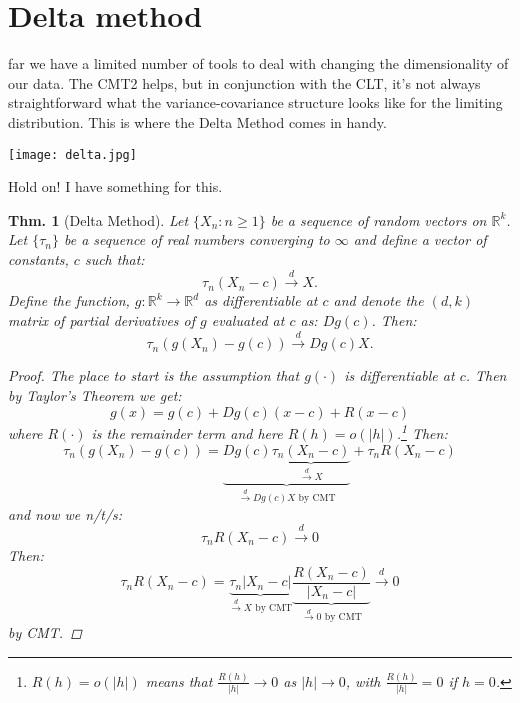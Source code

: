 \documentclass{tufte-book}
\theoremstyle{mytheoremstyle}
\newtheorem*{thm}{Thm.}
\theoremstyle{mylemstyle}
\theoremstyle{mydefstyle}
\begin{document}
\section{Delta method}
 far we have a limited number of tools to deal with changing the dimensionality of our data. The CMT2 helps, but in conjunction with the CLT, it's not always straightforward what the variance-covariance structure looks like for the limiting distribution. This is where the Delta Method comes in handy.
\begin{marginfigure}
	\texttt{[image: delta.jpg]}
	\caption{Hold on! I have something for this.}
\end{marginfigure}
\begin{thm}[Delta Method] Let \(\{X_n: n \ge 1\}\) be a sequence of random vectors on \(\mathbb{R}^k\). Let \(\{\tau_n\}\) be a sequence of real numbers converging to \(\infty\) and define a vector of constants, \(c\) such that:
	\[\tau_n(X_n - c) \overset{d}{\rightarrow} X\text{.}\]
Define the function, \(g: \mathbb{R}^k \rightarrow \mathbb{R}^d\) as differentiable at \(c\) and denote the \((d, k)\) matrix of partial derivatives of \(g\) evaluated at \(c\) as: \(Dg(c)\). Then:
	\[\tau_n(g(X_n) - g(c)) \overset{d}{\rightarrow} Dg(c)X \text{.}\]
	
	\begin{proof} The place to start is the assumption that \(g(\cdot)\) is differentiable at \(c\). Then by Taylor's Theorem we get:
			\[g(x) = g(c) + Dg(c)(x-c) + R(x-c)\]
		where \(R(\cdot)\) is the remainder term and here \(R(h) = o(|h|)\).\footnote{\(R(h) = o(|h|)\) means that \(\frac{R(h)}{|h|} \rightarrow 0\) as \(|h| \rightarrow 0\), with \(\frac{R(h)}{|h|} = 0\) if \(h = 0\).} Then:
			\[\tau_n(g(X_n) - g(c)) = \underbrace{Dg(c)\underbrace{\tau_n(X_n - c)}_\textrm{\(\overset{d}{\rightarrow} X\)}}_\textrm{\(\overset{d}{\rightarrow} Dg(c)X\) by CMT} + \tau_n R(X_n - c)\]
		and now we n/t/s:
			\[\tau_n R(X_n - c) \overset{d}{\rightarrow} 0\]
		Then:
			\[\tau_n R(X_n - c) = \underbrace{\tau_n |X_n - c|}_\textrm{\(\overset{d}{\rightarrow} X\) by CMT} \underbrace{\frac{ R(X_n - c)}{|X_n - c|}}_\textrm{\(\overset{d}{\rightarrow}0\) by CMT} \overset{d}{\rightarrow} 0\]
		by CMT.
	\end{proof}
\end{thm}
\end{document}
